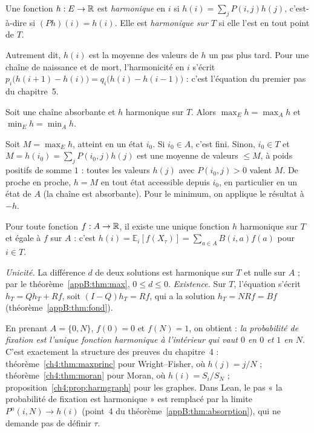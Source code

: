 \begin{definition}
Une fonction $h:E\to\mathbb{R}$ est \emph{harmonique} en $i$ si $h(i)=\sum_jP(i,j)h(j)$, c'est-à-dire si $(Ph)(i)=h(i)$. Elle
est \emph{harmonique sur $T$} si elle l'est en tout point de $T$.
\end{definition}
Autrement dit, $h(i)$ est la moyenne des valeurs de $h$ un pas plus tard. Pour une chaîne de naissance et de mort,
l'harmonicité en $i$ s'écrit $p_i\bigl(h(i+1)-h(i)\bigr)=q_i\bigl(h(i)-h(i-1)\bigr)$ : c'est l'équation du premier pas du
chapitre~5.

\begin{theorem}\label{appB:thm:max}
Soit une chaîne absorbante et $h$ harmonique sur $T$. Alors $\max_Eh=\max_Ah$ et $\min_Eh=\min_Ah$.
\end{theorem}

\begin{humanproof}
Soit $M=\max_Eh$, atteint en un état $i_0$. Si $i_0\in A$, c'est fini. Sinon, $i_0\in T$ et
$M=h(i_0)=\sum_jP(i_0,j)h(j)$ est une moyenne de valeurs $\le M$, à poids positifs de somme $1$ : toutes les valeurs
$h(j)$ avec $P(i_0,j)>0$ valent $M$. De proche en proche, $h=M$ en tout état accessible depuis $i_0$, en particulier
en un état de $A$ (la chaîne est absorbante). Pour le minimum, on applique le résultat à $-h$.
\end{humanproof}

\begin{corollary}\label{appB:cor:dirichlet}
Pour toute fonction $f:A\to\mathbb{R}$, il existe une unique fonction $h$ harmonique sur $T$ et égale à $f$ sur $A$ : c'est
$h(i)=\mathbb E_i[f(X_\tau)]=\sum_{a\in A}B(i,a)f(a)$ pour $i\in T$.
\end{corollary}

\begin{humanproof}
\emph{Unicité.} La différence $d$ de deux solutions est harmonique sur $T$ et nulle sur $A$ ; par le
théorème~\ref{appB:thm:max}, $0\le d\le0$.
\emph{Existence.} Sur $T$, l'équation s'écrit $h_T=Qh_T+Rf$, soit $(I-Q)h_T=Rf$, qui a la solution $h_T=NRf=Bf$
(théorème~\ref{appB:thm:fond}).
\end{humanproof}

En prenant $A=\{0,N\}$, $f(0)=0$ et $f(N)=1$, on obtient : \emph{la probabilité de fixation est l'unique fonction
harmonique à l'intérieur qui vaut $0$ en $0$ et $1$ en $N$}. C'est exactement la structure des preuves du chapitre~4 :
théorème~\ref{ch4:thm:maxprinc} pour Wright--Fisher, où $h(j)=j/N$ ; théorème~\ref{ch4:thm:moran} pour Moran, où
$h(i)=S_i/S_N$ ; proposition~\ref{ch4:prop:harmgraph} pour les graphes. Dans Lean, le pas « la probabilité de
fixation est harmonique » est remplacé par la limite $P^n(i,N)\to h(i)$ (point~4 du théorème~\ref{appB:thm:absorption}),
qui ne demande pas de définir $\tau$.

